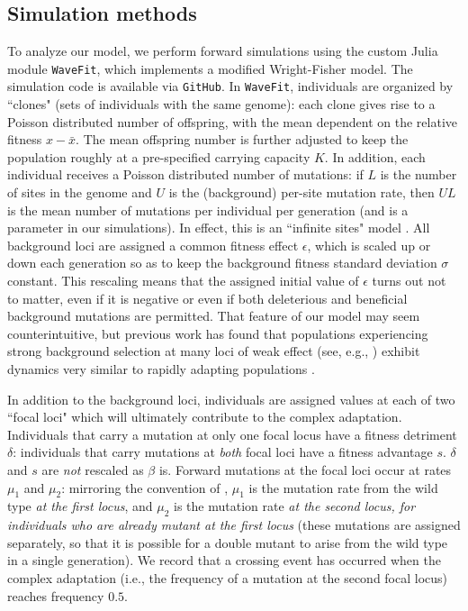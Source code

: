 \documentclass[10pt,twocolumn,twoside]{gsajnl}
\begin{document}
\begin{spacing}{1.5}
\section{Simulation methods}

To analyze our model, we perform forward simulations using the custom Julia module \texttt{WaveFit}, which implements a modified Wright-Fisher model.
The simulation code is available via \texttt{GitHub}.
In \texttt{WaveFit}, individuals are organized by ``clones" (sets of individuals with the same genome): each clone gives rise to a Poisson distributed number of offspring, with the mean dependent on the relative fitness $x-\bar{x}$.
The mean offspring number is further adjusted to keep the population roughly at a pre-specified carrying capacity $K$.
In addition, each individual receives a Poisson distributed number of mutations: if $L$ is the number of sites in the genome and $U$ is the (background) per-site mutation rate, then $UL$ is the mean number of mutations per individual per generation (and is a parameter in our simulations).
In effect, this is an ``infinite sites" model \citep{Kimura:1971,Watterson:1975}.
All background loci are assigned a common fitness effect $\epsilon$, which is scaled up or down each generation so as to keep the background fitness standard deviation $\sigma$ constant.
This rescaling means that the assigned initial value of $\epsilon$ turns out not to matter, even if it is negative or even if both deleterious and beneficial background mutations are permitted.
That feature of our model may seem counterintuitive, but previous work has found that populations experiencing strong background selection at many loci of weak effect (see, e.g., \citet{cvijovic_2015}) exhibit dynamics very similar to rapidly adapting populations \citep{desai_fisher_2007, neher_shraiman_2011}.

In addition to the background loci, individuals are assigned values at each of two ``focal loci" which will ultimately contribute to the complex adaptation.
Individuals that carry a mutation at only one focal locus have a fitness detriment $\delta$: individuals that carry mutations at \emph{both} focal loci have a fitness advantage $s$.
$\delta$ and $s$ are \emph{not} rescaled as $\beta$ is.
Forward mutations at the focal loci occur at rates $\mu_1$ and $\mu_2$: mirroring the convention of \citet{weissman_2009}, $\mu_1$ is the mutation rate from the wild type \emph{at the first locus}, and $\mu_2$ is the mutation rate \emph{at the second locus, for individuals who are already mutant at the first locus} (these mutations are assigned separately, so that it is possible for a double mutant to arise from the wild type in a single generation).
We record that a crossing event has occurred when the complex adaptation (i.e., the frequency of a mutation at the second focal locus) reaches frequency $0.5$.


\end{spacing}
\end{document}
